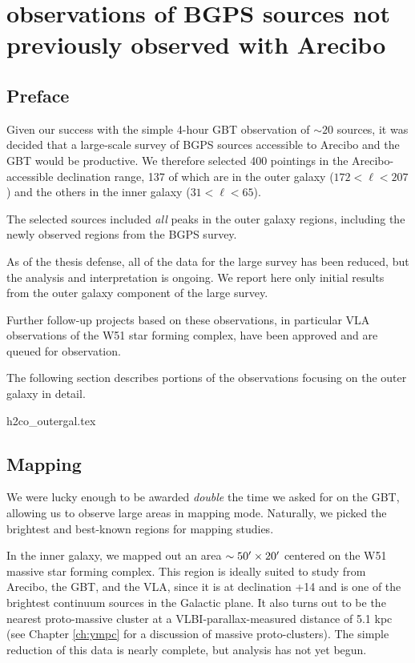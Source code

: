 
\chapter{\formaldehyde observations of BGPS sources not previously observed with Arecibo}
\label{ch:h2colarge}


\section{Preface} 

Given our success with the simple 4-hour GBT observation of $\sim20$ sources,
it was decided that a large-scale survey of BGPS sources accessible to Arecibo
and the GBT would be productive.  We therefore selected 400 pointings in the
Arecibo-accessible declination range, 137 of which are in the outer galaxy
($172<\ell<207$) and the others in the inner galaxy ($31<\ell<65$).

The selected sources included \emph{all} peaks in the outer galaxy regions,
including the newly observed regions from the BGPS \vtwo survey.

As of the thesis defense, all of the data for the large survey has been reduced,
but the analysis and interpretation is ongoing.  We report here only initial
results from the outer galaxy component of the large survey.

Further follow-up projects based on these observations, in particular VLA
observations of the W51 star forming complex, have been approved and are
queued for observation.

The following section describes portions of the \formaldehyde observations focusing
on the outer galaxy in detail.

{h2co_outergal.tex}


\section{\formaldehyde Mapping}
We were lucky enough to be awarded \emph{double} the time we asked for on the GBT,
allowing us to observe large areas in mapping mode.  
Naturally, we picked the brightest and best-known regions for mapping studies.

In the inner galaxy, we mapped out an area $\sim50\mbox{$^\prime$}\times20\mbox{$^\prime$}$ centered
on the W51 massive star forming complex.  This region is ideally suited to study from Arecibo,
the GBT, and the VLA, since it is at declination +14 and is one of the brightest continuum
sources in the Galactic plane.  It also turns out to be the nearest proto-massive cluster
at a VLBI-parallax-measured distance of 5.1 kpc (see Chapter \ref{ch:ympc} for a discussion
of massive proto-clusters).  The simple reduction of this data is nearly complete, but 
analysis has not yet begun.

